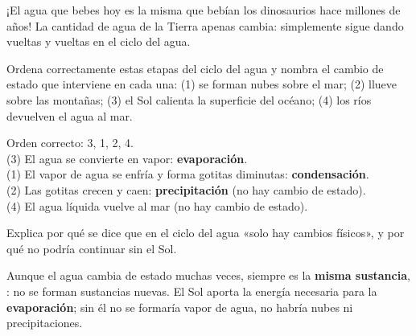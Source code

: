 \begin{didyouknow}
    ¡El agua que bebes hoy es la misma que bebían los dinosaurios hace millones de años! La cantidad de agua de la Tierra apenas cambia: simplemente sigue dando vueltas y vueltas en el ciclo del agua.
\end{didyouknow}

\begin{exercise}
    Ordena correctamente estas etapas del ciclo del agua y nombra el cambio de estado que interviene en cada una: (1) se forman nubes sobre el mar; (2) llueve sobre las montañas; (3) el Sol calienta la superficie del océano; (4) los ríos devuelven el agua al mar.
    \begin{solu}
        Orden correcto: 3, 1, 2, 4. \\
        (3) El agua se convierte en vapor: \textbf{evaporación}. \\
        (1) El vapor de agua se enfría y forma gotitas diminutas: \textbf{condensación}. \\
        (2) Las gotitas crecen y caen: \textbf{precipitación} (no hay cambio de estado). \\
        (4) El agua líquida vuelve al mar (no hay cambio de estado).
    \end{solu}
\end{exercise}

\begin{exercise}
    Explica por qué se dice que en el ciclo del agua «solo hay cambios físicos», y por qué no podría continuar sin el Sol.
    \begin{solu}
        Aunque el agua cambia de estado muchas veces, siempre es la \textbf{misma sustancia}, : no se forman sustancias nuevas. El Sol aporta la energía necesaria para la \textbf{evaporación}; sin él no se formaría vapor de agua, no habría nubes ni precipitaciones.
    \end{solu}
\end{exercise}

